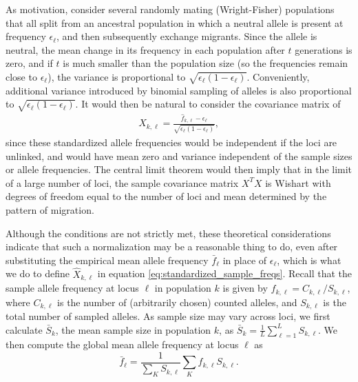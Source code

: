 \documentclass[10pt,letterpaper]{article}
\begin{document}
As motivation, consider several randomly mating (Wright-Fisher) populations
that all split from an ancestral population
in which a neutral allele is present at frequency $\epsilon_\ell$,
and then subsequently exchange migrants.
Since the allele is neutral, the mean change in its frequency in each population after $t$ generations is zero,
and if $t$ is much smaller than the population size (so the frequencies remain close to $\epsilon_\ell$), 
the variance is proportional to $\sqrt{\epsilon_\ell (1-\epsilon_\ell)}$.
Conveniently, additional variance introduced by binomial sampling of alleles
is also proportional to $\sqrt{\epsilon_\ell (1-\epsilon_\ell)}$.
It would then be natural to consider the covariance matrix of 
\begin{align}
  X_{k,\ell} = \frac{ \hat f_{k,\ell} - \epsilon_\ell }{ \sqrt{ \epsilon_\ell (1- \epsilon_\ell) } } ,
\end{align}
since these standardized allele frequencies would be independent if the loci are unlinked,
and would have mean zero and variance independent of the sample sizes or allele frequencies.
The central limit theorem would then imply that in the limit of a large number of loci, 
the sample covariance matrix $X^T X$ is Wishart with degrees of freedom equal to the number of loci
and mean determined by the pattern of migration.

Although the conditions are not strictly met, 
these theoretical considerations indicate that such a normalization may be a reasonable thing to do,
even after substituting the empirical mean allele frequency $\bar f_\ell$ in place of $\epsilon_\ell$,
which is what we do to define $\hat X_{k,\ell}$ in equation \eqref{eq:standardized_sample_freqs}.
Recall that the sample allele frequency at locus $\ell$ in population $k$ is given by $\hat{f}_{k,\ell} = C_{k,\ell}/S_{k,\ell}$,  
where $C_{k,\ell}$ is the number of (arbitrarily chosen) counted alleles,
and $S_{k,\ell}$ is the total number of sampled alleles.
As sample size may vary across loci, we first calculate $\bar{S}_k$, 
the mean sample size in population $k$, 
as $\bar{S}_k = \frac{1}{L}\sum_{\ell=1}^L S_{k,\ell}$.  
We then compute the global mean allele frequency at locus $\ell$ as
\begin{equation}
\label{eq:sample_mean_freq}
\bar{f}_{\ell} = \frac{1}{\sum_K S_{k,\ell}} \sum_K \hat{f}_{k,\ell} S_{k,\ell} .
\end{equation}
\end{document}
